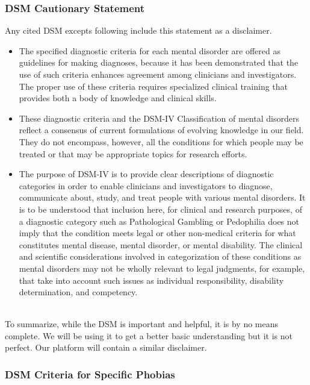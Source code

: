 \documentclass[a4paper,10pt]{article}
\begin{document}
\subsubsection{DSM Cautionary Statement}
Any cited DSM excepts following include this statement as a disclaimer. \cite{dsmCaution}
\begin{itemize}

\item The specified diagnostic criteria for each mental disorder are offered as guidelines for making diagnoses, because it has been demonstrated that the use of such criteria enhances agreement among clinicians and investigators. The proper use of these criteria requires specialized clinical training that provides both a body of knowledge and clinical skills. 

\item These diagnostic criteria and the DSM-IV Classification of mental disorders reflect a consensus of current formulations of evolving knowledge in our field. They do not encompass, however, all the conditions for which people may be treated or that may be appropriate topics for research efforts. 

\item The purpose of DSM-IV is to provide clear descriptions of diagnostic categories in order to enable clinicians and investigators to diagnose, communicate about, study, and treat people with various mental disorders. It is to be understood that inclusion here, for clinical and research purposes, of a diagnostic category such as Pathological Gambling or Pedophilia does not imply that the condition meets legal or other non-medical criteria for what constitutes mental disease, mental disorder, or mental disability. The clinical and scientific considerations involved in categorization of these conditions as mental disorders may not be wholly  relevant to legal judgments, for example, that take into account such issues as individual responsibility, disability determination, and competency.
\end{itemize}
\par~\\
To summarize, while the DSM is important and helpful, it is by no means complete.  We will be using it to get a better basic understanding but it is not perfect.  Our platform will contain a similar disclaimer.
\par
\subsubsection{DSM Criteria for Specific Phobias}
\end{document}
